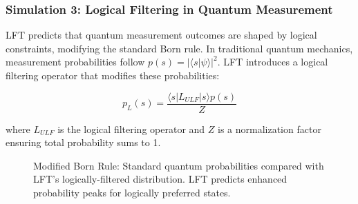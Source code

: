 \subsubsection{Simulation 3: Logical Filtering in Quantum Measurement}
LFT predicts that quantum measurement outcomes are shaped by logical constraints, modifying the standard Born rule. In traditional quantum mechanics, measurement probabilities follow $p(s) = |\langle s|\psi\rangle|^2$. LFT introduces a logical filtering operator that modifies these probabilities:

\[
p_L(s) = \frac{\langle s | L_{ULF} | s \rangle p(s)}{Z}
\]

where $L_{ULF}$ is the logical filtering operator and $Z$ is a normalization factor ensuring total probability sums to 1.

\begin{figure}[h]
\centering
{}
\caption{Modified Born Rule: Standard quantum probabilities compared with LFT's logically-filtered distribution. LFT predicts enhanced probability peaks for logically preferred states.}
\label{fig:born_rule}


\end{figure}
